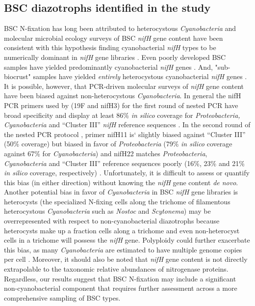 \subsection{BSC diazotrophs identified in the study} BSC N-fixation has long
been attributed to heterocystous \textit{Cyanobacteria} and molecular microbial
ecology surveys of BSC \textit{nifH} gene content have been consistent with
this hypothesis finding cyanobacterial \textit{nifH} types to be numerically
dominant in \textit{nifH} gene libraries \citep{Yeager,14766579,Yeager_2012}.
Even poorly developed BSC samples have yielded predominantly cyanobacterial
\textit{nifH} genes \citep{14766579}. And,
"sub-biocrust" samples have yielded \textit{entirely} heterocystous
cyanobacterial \textit{nifH} genes \citep{Yeager_2012}.
It is possible, however, that PCR-driven molecular surveys of \textit{nifH}
gene content have been biased against non-heterocystous \textit{Cyanobacteria}.
In general the nifH PCR primers used by \citet{Yeager,14766579,Yeager_2012}
(19F and nifH3) for the first round of nested PCR have broad specificity and
display at least 86\% \textit{in silico} coverage for \textit{Proteobacteria,
Cyanobacteria} and ``Cluster III'' \textit{nifH} reference sequences
\citep{Gaby_2012}. In the second round of the nested PCR protocol
\citep{Yeager,14766579,Yeager_2012}, primer nifH11 is` slightly biased against
``Cluster III'' (50\% coverage) but biased in favor of \textit{Proteobacteria}
(79\% \textit{in silico} coverage against 67\% for \textit{Cyanobacteria}) and
nifH22 matches \textit{Proteobacteria}, \textit{Cyanobacteria} and ``Cluster
III'' reference sequences poorly (16\%, 23\% and 21\% \textit{in silico}
coverage, respectively) \citep{Gaby_2012}.  Unfortunately, it is difficult to
assess or quantify this bias (in either direction) without knowing the
\textit{nifH} gene content \textit{de novo}. Another potential bias in favor of
\textit{Cyanobacteria} in BSC \textit{nifH} gene libraries is heterocysts (the
specialized N-fixing cells along the trichome of filamentous heterocystous
\textit{Cyanobacteria} such as \textit{Nostoc} and \textit{Scytonema}) may be
overrepresented with respect to non-cyanobacterial diazotrophs because
heterocysts make up a fraction cells along a trichome and even non-heterocyst
cells in a trichome will possess the \textit{nifH} gene. Polyploidy could
further exacerbate this bias, as many \textit{Cyanobacteria} are estimated to
have multiple genome copies per cell \citep{Griese_2011}. Moreover, it should
also be noted that \textit{nifH} gene content is not directly extrapolable to
the taxonomic relative abundances of nitrogenase proteins. Regardless, our
results suggest that BSC N-fixation may include a significant
non-cyanobacterial component that requires further assessment across a more
comprehensive sampling of BSC types.

